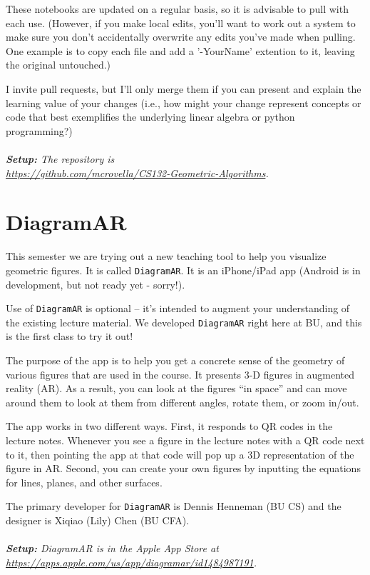 \documentclass[11pt]{article}
\begin{document}
These notebooks are updated on a regular basis, so it is
advisable to pull with each use.  (However, if you make local edits,
you'll want to work out a 
system to make sure you don't accidentally overwrite any edits you've
made when pulling. One example is to copy each file and add a
'-YourName' extention to it, leaving the original untouched.)

I invite pull requests, but I'll only merge them
if you can present and explain the learning value of your changes (i.e.,
how might your change represent concepts or code that best
exemplifies the underlying linear algebra or python
programming?) 
\\
~\\\emph{\textbf{Setup:} The
repository is \\
\url{https://github.com/mcrovella/CS132-Geometric-Algorithms}.}

\section*{DiagramAR} 

This semester we are trying out a new teaching tool to help you
visualize geometric figures.   It is called \texttt{DiagramAR}.  It is
an iPhone/iPad app (Android is in development, but not ready yet - sorry!).

Use of \texttt{DiagramAR} is optional -- it's intended to augment your
understanding of the existing lecture material.    We developed
\texttt{DiagramAR} right here at BU, and this is the first class to try it out!

The purpose of the app is to help you get a concrete sense of the
geometry of various figures that are used in the course.    It presents
3-D figures in augmented reality (AR).   As a result, you can look at the
figures ``in space'' and can move around them to look at them from
different angles, rotate them, or zoom in/out.

The app works in two different ways.    First, it responds to QR codes
in the lecture notes.   Whenever you see a figure in the lecture notes
with a QR code next to it, then pointing the app at that code will pop
up a 3D representation of the figure in AR.    Second, you can create
your own figures by inputting the equations for lines, planes, and other
surfaces.

The primary developer for \texttt{DiagramAR} is Dennis
Henneman (BU CS) and the designer is Xiqiao (Lily) Chen (BU CFA).   
\\
~\\\emph{\textbf{Setup:} 
DiagramAR is in the Apple App Store at \\
\url{https://apps.apple.com/us/app/diagramar/id1484987191}. }
\end{document}
